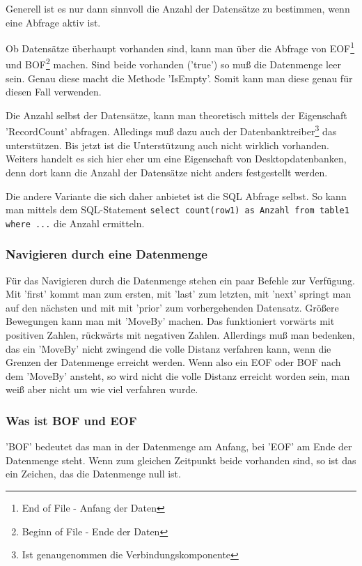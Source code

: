 Generell ist es nur dann sinnvoll die Anzahl der Datensätze zu bestimmen, wenn eine Abfrage aktiv ist.

Ob Datensätze überhaupt vorhanden sind, kann man über die Abfrage von EOF\footnote{End of File - Anfang der Daten} und BOF\footnote{Beginn of File - Ende der Daten} machen. Sind beide vorhanden ('true') so muß die Datenmenge leer sein. Genau diese macht die Methode 'IsEmpty'. Somit kann man diese genau für diesen Fall verwenden.

Die Anzahl selbst der Datensätze, kann man theoretisch mittels der Eigenschaft 'RecordCount' abfragen. Alledings muß dazu auch der Datenbanktreiber\footnote{Ist genaugenommen die Verbindungskomponente} das unterstützen. Bis jetzt ist die Unterstützung auch nicht wirklich vorhanden. Weiters handelt es sich hier eher um eine Eigenschaft von Desktopdatenbanken, denn dort kann die Anzahl der Datensätze nicht anders festgestellt werden.

Die andere Variante die sich daher anbietet ist die SQL Abfrage selbst. So kann man mittels dem SQL-Statement \verb|select count(row1) as Anzahl from table1 where ...| die Anzahl ermitteln.

%

\subsubsection{Navigieren durch eine Datenmenge}
Für das Navigieren durch die Datenmenge stehen ein paar Befehle zur Verfügung. Mit 'first' kommt man zum ersten, mit 'last' zum letzten, mit 'next' springt man auf den nächsten und mit mit 'prior' zum vorhergehenden Datensatz. Größere Bewegungen kann man mit 'MoveBy' machen. Das funktioniert vorwärts mit positiven Zahlen, rückwärts mit negativen Zahlen. Allerdings muß man bedenken, das ein 'MoveBy' nicht zwingend die volle Distanz verfahren kann, wenn die Grenzen der Datenmenge erreicht werden. Wenn also ein EOF oder BOF nach dem 'MoveBy' ansteht, so wird nicht die volle Distanz erreicht worden sein, man weiß aber nicht um wie viel verfahren wurde.

\subsubsection{Was ist BOF und EOF}
'BOF' bedeutet das man in der Datenmenge am Anfang, bei 'EOF'  am Ende der Datenmenge steht. Wenn zum gleichen Zeitpunkt beide vorhanden sind, so ist das ein Zeichen, das die Datenmenge null ist.

